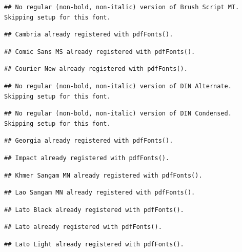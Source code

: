 \documentclass[]{article}
\theoremstyle{definition}
\theoremstyle{definition}
\theoremstyle{definition}
\theoremstyle{remark}
\begin{document}
\begin{verbatim}
## No regular (non-bold, non-italic) version of Brush Script MT. Skipping setup for this font.
\end{verbatim}

\begin{verbatim}
## Cambria already registered with pdfFonts().
\end{verbatim}

\begin{verbatim}
## Comic Sans MS already registered with pdfFonts().
\end{verbatim}

\begin{verbatim}
## Courier New already registered with pdfFonts().
\end{verbatim}

\begin{verbatim}
## No regular (non-bold, non-italic) version of DIN Alternate. Skipping setup for this font.
\end{verbatim}

\begin{verbatim}
## No regular (non-bold, non-italic) version of DIN Condensed. Skipping setup for this font.
\end{verbatim}

\begin{verbatim}
## Georgia already registered with pdfFonts().
\end{verbatim}

\begin{verbatim}
## Impact already registered with pdfFonts().
\end{verbatim}

\begin{verbatim}
## Khmer Sangam MN already registered with pdfFonts().
\end{verbatim}

\begin{verbatim}
## Lao Sangam MN already registered with pdfFonts().
\end{verbatim}

\begin{verbatim}
## Lato Black already registered with pdfFonts().
\end{verbatim}

\begin{verbatim}
## Lato already registered with pdfFonts().
\end{verbatim}

\begin{verbatim}
## Lato Light already registered with pdfFonts().
\end{verbatim}
\end{document}
